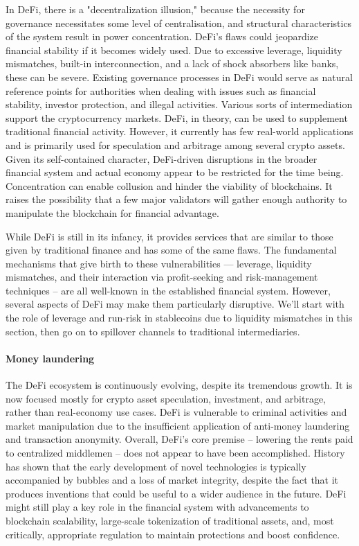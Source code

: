 \documentclass[10pt,twocolumn]{article}
\begin{document}
In DeFi, there is a "decentralization illusion," because the necessity for governance necessitates some level of centralisation, and structural characteristics of the system result in power concentration. DeFi's flaws could jeopardize financial stability if it becomes widely used. Due to excessive leverage, liquidity mismatches, built-in interconnection, and a lack of shock absorbers like banks, these can be severe. Existing governance processes in DeFi would serve as natural reference points for authorities when dealing with issues such as financial stability, investor protection, and illegal activities. Various sorts of intermediation support the cryptocurrency markets. DeFi, in theory, can be used to supplement traditional financial activity.
However, it currently has few real-world applications and is primarily used for speculation and arbitrage among several crypto assets. Given its self-contained character, DeFi-driven disruptions in the broader financial system and actual economy appear to be restricted for the time being. Concentration can enable collusion and hinder the viability of blockchains. It raises the possibility that a few major validators will gather enough authority to manipulate the blockchain for financial advantage. 

While DeFi is still in its infancy, it provides services that are similar to those given by traditional finance and has some of the same flaws. The fundamental mechanisms that give birth to these vulnerabilities — leverage, liquidity mismatches, and their interaction via profit-seeking and risk-management techniques – are all well-known in the established financial system. However, several aspects of DeFi may make them particularly disruptive. We'll start with the role of leverage and run-risk in stablecoins due to liquidity mismatches in this section, then go on to spillover channels to traditional intermediaries.
\paragraph{Money laundering}

The DeFi ecosystem is continuously evolving, despite its tremendous growth. It is now focused mostly for crypto asset speculation, investment, and arbitrage, rather than real-economy use cases. DeFi is vulnerable to criminal activities and market manipulation due to the insufficient application of anti-money laundering and transaction anonymity. Overall, DeFi's core premise – lowering the rents paid to centralized middlemen – does not appear to have been accomplished.\cite{Fletcher}
History has shown that the early development of novel technologies is typically accompanied by bubbles and a loss of market integrity, despite the fact that it produces inventions that could be useful to a wider audience in the future. DeFi might still play a key role in the financial system with advancements to blockchain scalability, large-scale tokenization of traditional assets, and, most critically, appropriate regulation to maintain protections and boost confidence.
\end{document}
